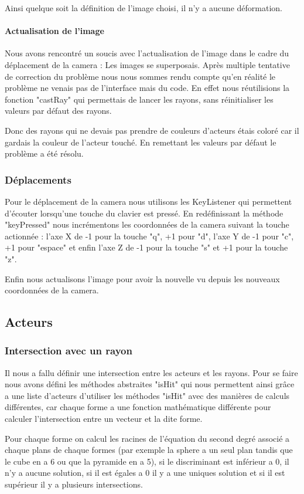 \documentclass[12pt]{article}
\begin{document}
				Ainsi quelque soit la définition de l'image choisi, il n'y a aucune déformation.				
				\paragraph{Actualisation de l'image}
				Nous avons rencontré un soucis avec l'actualisation de l'image dans le cadre du déplacement de la camera : Les images se superposais. Après multiple tentative de correction du problème nous nous sommes rendu compte qu'en réalité le problème ne venais pas de l'interface mais du code. En effet nous réutilisions la fonction "castRay" qui permettais de lancer les rayons, sans réinitialiser les valeurs par défaut des rayons.
				
				Donc des rayons qui ne devais pas prendre de couleurs d'acteurs étais coloré car il gardais la couleur de l'acteur touché. En remettant les valeurs par défaut le problème a été résolu.
			\subsubsection{Déplacements}
			Pour le déplacement de la camera nous utilisons les KeyListener qui permettent d'écouter lorsqu'une touche du clavier est pressé. En redéfinissant la méthode "keyPressed" nous incrémentons les coordonnées de la camera suivant la touche actionnée : l'axe X de -1 pour la touche "q", +1 pour "d", l'axe Y de -1 pour "c", +1 pour "espace" et enfin l'axe Z de -1 pour la touche "s" et +1 pour la touche "z".
			
			Enfin nous actualisons l'image pour avoir la nouvelle vu depuis les nouveaux coordonnées de la camera.
		\subsection{Acteurs}
			\subsubsection{Intersection avec un rayon}
			Il nous a fallu définir une intersection entre les acteurs et les rayons. Pour se faire nous avons défini les méthodes abstraites "isHit" qui nous permettent ainsi grâce a une liste d'acteurs d'utiliser les méthodes "isHit" avec des manières de calculs différentes, car chaque forme a une fonction mathématique différente pour calculer l'intersection entre un vecteur et la dite forme. 
			
			Pour chaque forme on calcul les racines de l'équation du second degré associé a chaque plans de chaque formes (par exemple la sphere a un seul plan tandis que le cube en a 6 ou que la pyramide en a 5), si le discriminant est inférieur a 0, il n'y a aucune solution, si il est égales a 0 il y a une uniques solution et si il est supérieur il y a plusieurs intersections.
			
\end{document}
